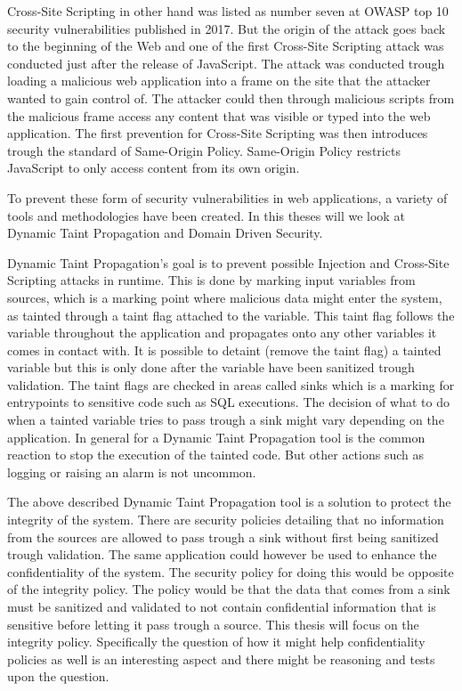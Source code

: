 \documentclass{../kththesis}
\begin{document}
Cross-Site Scripting in other hand was listed as number seven at OWASP top 10 security vulnerabilities published in 2017. \parencite{OWASP2017} But the origin of the attack goes back to the beginning of the Web and one of the first Cross-Site Scripting attack was conducted just after the release of JavaScript. The attack was conducted trough loading a malicious web application into a frame on the site that the attacker wanted to gain control of. The attacker could then through malicious scripts from the malicious frame access any content that was visible or typed into the web application. The first prevention for Cross-Site Scripting was then introduces trough the standard of Same-Origin Policy. Same-Origin Policy restricts JavaScript to only access content from its own origin. \parencite{FogieSeth2007Xacs, w3csop} 

To prevent these form of security vulnerabilities in web applications, a variety of tools and methodologies have been created. In this theses will we look at Dynamic Taint Propagation and Domain Driven Security. 

Dynamic Taint Propagation's goal is to prevent possible Injection and Cross-Site Scripting attacks in runtime. This is done by marking input variables from sources, which is a marking point where malicious data might enter the system, as tainted through a taint flag attached to the variable. This taint flag follows the variable throughout the application and propagates onto any other variables it comes in contact with. It is possible to detaint (remove the taint flag) a tainted variable but this is only done after the variable have been sanitized trough validation. The taint flags are checked in areas called sinks which is a marking for entrypoints to sensitive code such as SQL executions. \parencite{Pan2015, Venkataramani2008} The decision of what to do when a tainted variable tries to pass trough a sink might vary depending on the application. In general for a Dynamic Taint Propagation tool is the common reaction to stop the execution of the tainted code. But other actions such as logging or raising an alarm is not uncommon. 

The above described Dynamic Taint Propagation tool is a solution to protect the integrity of the system. There are security policies detailing that no information from the sources are allowed to pass trough a sink without first being sanitized trough validation. The same application could however be used to enhance the confidentiality of the system. The security policy for doing this would be opposite of the integrity policy. The policy would be that the data that comes from a sink must be sanitized and validated to not contain confidential information that is sensitive before letting it pass trough a source. This thesis will focus on the integrity policy. Specifically the question of how it might help confidentiality policies as well is an interesting aspect and there might be reasoning and tests upon the question.
\end{document}
